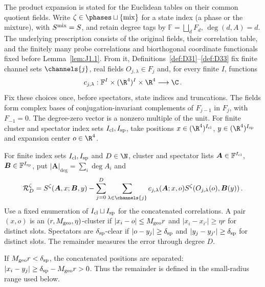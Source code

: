 The product expansion is stated for the Euclidean tables on their common quotient fields. Write $\zeta\in\phases\sqcup\{\mathrm{mix}\}$ for a state index (a phase or the mixture), with $S^{\rm mix}=S$, and retain degree tags by $\mathbb F=\bigsqcup_dF_d$, $\deg(d,A)=d$. The underlying prescription consists of the original fields, their correlation table, and the finitely many probe correlations and biorthogonal coordinate functionals fixed before Lemma~\ref{lem:J1.1}. From it, Definitions~\ref{def:D31}--\ref{def:D33} fix finite channel sets $\channels{j}$, real fields $O_{j,\lambda}\in F_j$ and, for every finite $I$, functions
\begin{equation*}
c_{j,\lambda}:\mathbb F^I\times(\R^4)^I\times\R^4\longrightarrow\C\,.
\end{equation*}
Fix these choices once, before spectators, state indices and truncations. The fields form complex bases of conjugation-invariant complements of $F_{j-1}$ in $F_j$, with $F_{-1}=0$. The degree-zero vector is a nonzero multiple of the unit. For finite cluster and spectator index sets $I_{\rm cl},I_{\rm sp}$, take positions $x\in(\R^4)^{I_{\rm cl}}$, $y\in(\R^4)^{I_{\rm sp}}$ and expansion center $o\in\R^4$.

\begin{definition}\label{def:D18}
For finite index sets $I_{\rm cl},I_{\rm sp}$ and $D\in\N$, cluster and spectator lists $\boldsymbol A\in\mathbb F^{I_{\rm cl}}$, $\boldsymbol B\in\mathbb F^{I_{\rm sp}}$, put $|\boldsymbol A|_{\deg}=\sum_i\deg A_i$ and
\begin{equation*}
\mathcal R_D^\zeta=S^\zeta(\boldsymbol A,x;\boldsymbol B,y)-\sum_{j=0}^D\sum_{\lambda\in\channels{j}}c_{j,\lambda}(\boldsymbol A;x,o)S^\zeta(O_{j,\lambda}(o),\boldsymbol B(y))\,.
\end{equation*}
Use a fixed enumeration of $I_{\rm cl}\sqcup I_{\rm sp}$ for the concatenated correlations. A pair $(x,o)$ is an $(r,M_{\rm geo},\eta)$-cluster if $|x_i-o|\le M_{\rm geo}r$ and $|x_i-x_{i'}|\ge\eta r$ for distinct slots. Spectators are $\delta_{\rm sp}$-clear if $|o-y_j|\ge\delta_{\rm sp}$ and $|y_j-y_{j'}|\ge\delta_{\rm sp}$ for distinct slots. The remainder measures the error through degree $D$.
\end{definition}

If $M_{\rm geo}r<\delta_{\rm sp}$, the concatenated positions are separated: $|x_i-y_j|\ge\delta_{\rm sp}-M_{\rm geo}r>0$. Thus the remainder is defined in the small-radius range used below.

